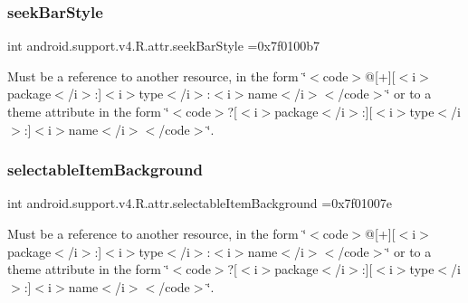 \subsubsection{\texorpdfstring{seek\+Bar\+Style}{seekBarStyle}}
{\footnotesize\ttfamily int android.\+support.\+v4.\+R.\+attr.\+seek\+Bar\+Style =0x7f0100b7\hspace{0.3cm}{\ttfamily [static]}}

Must be a reference to another resource, in the form \char`\"{}$<$code$>$@\mbox{[}+\mbox{]}\mbox{[}$<$i$>$package$<$/i$>$\+:\mbox{]}$<$i$>$type$<$/i$>$\+:$<$i$>$name$<$/i$>$$<$/code$>$\char`\"{} or to a theme attribute in the form \char`\"{}$<$code$>$?\mbox{[}$<$i$>$package$<$/i$>$\+:\mbox{]}\mbox{[}$<$i$>$type$<$/i$>$\+:\mbox{]}$<$i$>$name$<$/i$>$$<$/code$>$\char`\"{}. \mbox{\label{classandroid_1_1support_1_1v4_1_1R_1_1attr_ad8f2ff9ffc480605ea9be198ddab859c}} 
\subsubsection{\texorpdfstring{selectable\+Item\+Background}{selectableItemBackground}}
{\footnotesize\ttfamily int android.\+support.\+v4.\+R.\+attr.\+selectable\+Item\+Background =0x7f01007e\hspace{0.3cm}{\ttfamily [static]}}

Must be a reference to another resource, in the form \char`\"{}$<$code$>$@\mbox{[}+\mbox{]}\mbox{[}$<$i$>$package$<$/i$>$\+:\mbox{]}$<$i$>$type$<$/i$>$\+:$<$i$>$name$<$/i$>$$<$/code$>$\char`\"{} or to a theme attribute in the form \char`\"{}$<$code$>$?\mbox{[}$<$i$>$package$<$/i$>$\+:\mbox{]}\mbox{[}$<$i$>$type$<$/i$>$\+:\mbox{]}$<$i$>$name$<$/i$>$$<$/code$>$\char`\"{}. \mbox{\label{classandroid_1_1support_1_1v4_1_1R_1_1attr_ab47b2c143ce4560a046c603de1045404}} 
